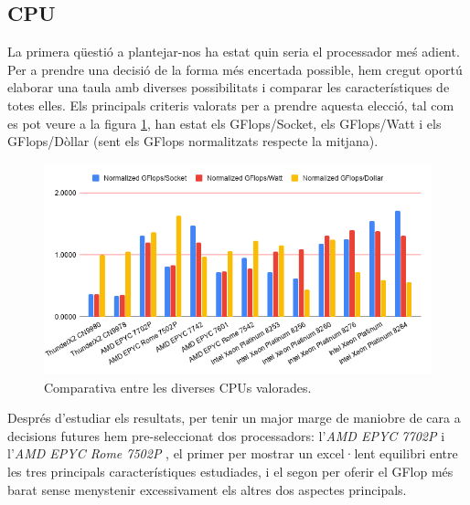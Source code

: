 \subsection{CPU}

La primera qüestió a plantejar-nos ha estat quin seria el processador meś adient. Per a prendre una decisió de la forma més encertada possible, hem cregut oportú elaborar una taula amb diverses possibilitats i comparar les característiques de totes elles. Els principals criteris valorats per a prendre aquesta elecció, tal com es pot veure a la figura \ref{chartCPUs}, han estat els GFlops/Socket, els GFlops/Watt i els GFlops/Dòllar (sent els GFlops normalitzats respecte la mitjana). 

\begin{figure}[h]
    \centering
    \includegraphics[width=\textwidth]{img/chartCPU}
    \caption{Comparativa entre les diverses CPUs valorades.}
    \label{chartCPUs}
\end{figure}

Després d'estudiar els resultats, per tenir un major marge de maniobre de cara a decisions futures hem pre-seleccionat dos processadors: l'\textit{AMD EPYC 7702P} \cite{cpu_amd_7702_buy} i l'\textit{AMD EPYC Rome 7502P} \cite{cpu_amd_7502_buy}, el primer per mostrar un excel·lent equilibri entre les tres principals característiques estudiades, i el segon per oferir el GFlop més barat sense menystenir excessivament els altres dos aspectes principals.